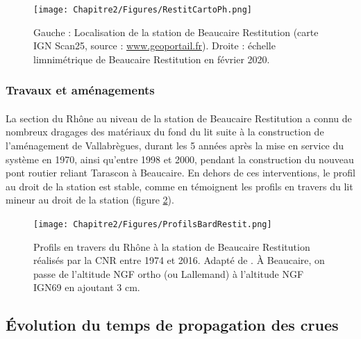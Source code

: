 	\begin{figure}[h]
	\centering
		\texttt{[image: Chapitre2/Figures/RestitCartoPh.png]}
        \caption{Gauche : Localisation de la station de Beaucaire Restitution (carte IGN Scan25, source : \url{www.geoportail.fr}). Droite : échelle limnimétrique de Beaucaire Restitution en février 2020.}	
		\label{fig:CartoRes}
	\end{figure}
	
	
		\subsubsection{Travaux et aménagements}

	\paragraph{} La section du Rhône au niveau de la station de Beaucaire Restitution a connu de nombreux dragages des matériaux du fond du lit suite à la construction de l'aménagement de Vallabrègues, durant les 5 années après la mise en service du système en 1970, ainsi qu'entre 1998 et 2000, pendant la construction du nouveau pont routier reliant Tarascon à Beaucaire. En dehors de ces interventions, le profil au droit de la station est stable, comme en témoignent les profils en travers du lit mineur au droit de la station (figure \ref{fig:ProfilsRestit}).
	
	\begin{figure}[h]
	\centering
		\texttt{[image: Chapitre2/Figures/ProfilsBardRestit.png]}
        \caption{Profils en travers du Rhône à la station de Beaucaire Restitution réalisés par la CNR entre 1974 et 2016. Adapté de \citet{bard_actualisation_2018}. À Beaucaire, on passe de l'altitude NGF ortho (ou Lallemand) à l'altitude NGF IGN69 en ajoutant 3 cm.}	
		\label{fig:ProfilsRestit}
	\end{figure}
	
\FloatBarrier


\subsection{Évolution du temps de propagation des crues}

